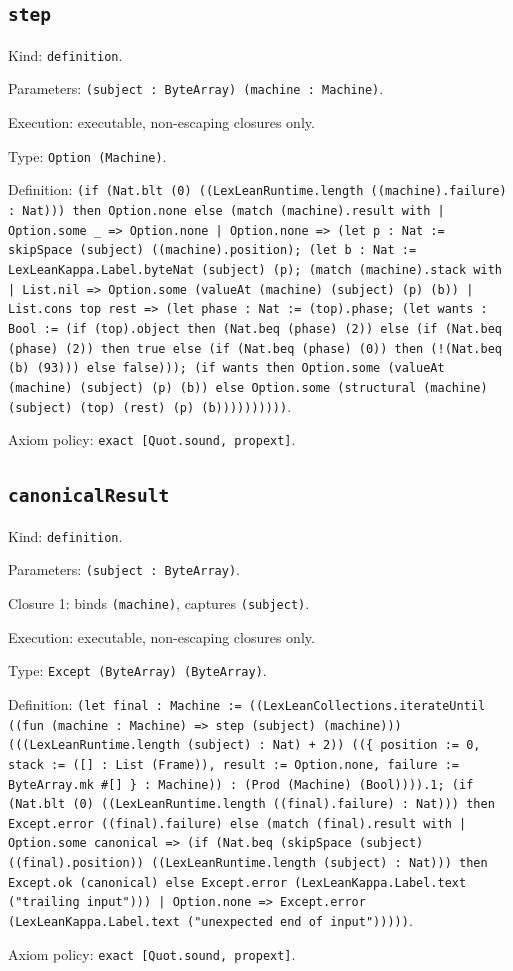 \documentclass[11pt]{article}
\begin{document}
\subsection*{\texttt{step}}
\noindent Kind: \texttt{definition}.\par
\noindent Parameters: \texttt{(subject : ByteArray) (machine : Machine)}.\par
\noindent Execution: executable, non-escaping closures only.\par
\noindent Type: \texttt{Option (Machine)}.\par
\noindent Definition: \texttt{(if (Nat.blt (0) ((LexLeanRuntime.length ((machine).failure) : Nat))) then Option.none else (match (machine).result with | Option.some \_ => Option.none | Option.none => (let p : Nat := skipSpace (subject) ((machine).position); (let b : Nat := LexLeanKappa.Label.byteNat (subject) (p); (match (machine).stack with | List.nil => Option.some (valueAt (machine) (subject) (p) (b)) | List.cons top rest => (let phase : Nat := (top).phase; (let wants : Bool := (if (top).object then (Nat.beq (phase) (2)) else (if (Nat.beq (phase) (2)) then true else (if (Nat.beq (phase) (0)) then (!(Nat.beq (b) (93))) else false))); (if wants then Option.some (valueAt (machine) (subject) (p) (b)) else Option.some (structural (machine) (subject) (top) (rest) (p) (b))))))))))}.\par
\noindent Axiom policy: \texttt{exact [Quot.sound, propext]}.\par
\subsection*{\texttt{canonicalResult}}
\noindent Kind: \texttt{definition}.\par
\noindent Parameters: \texttt{(subject : ByteArray)}.\par
\noindent Closure 1: binds \texttt{(machine)}, captures \texttt{(subject)}.\par
\noindent Execution: executable, non-escaping closures only.\par
\noindent Type: \texttt{Except (ByteArray) (ByteArray)}.\par
\noindent Definition: \texttt{(let final : Machine := ((LexLeanCollections.iterateUntil ((fun (machine : Machine) => step (subject) (machine))) (((LexLeanRuntime.length (subject) : Nat) + 2)) ((\{ position := 0, stack := ([] : List (Frame)), result := Option.none, failure := ByteArray.mk \#[] \} : Machine)) : (Prod (Machine) (Bool)))).1; (if (Nat.blt (0) ((LexLeanRuntime.length ((final).failure) : Nat))) then Except.error ((final).failure) else (match (final).result with | Option.some canonical => (if (Nat.beq (skipSpace (subject) ((final).position)) ((LexLeanRuntime.length (subject) : Nat))) then Except.ok (canonical) else Except.error (LexLeanKappa.Label.text ("trailing input"))) | Option.none => Except.error (LexLeanKappa.Label.text ("unexpected end of input")))))}.\par
\noindent Axiom policy: \texttt{exact [Quot.sound, propext]}.\par
\end{document}
